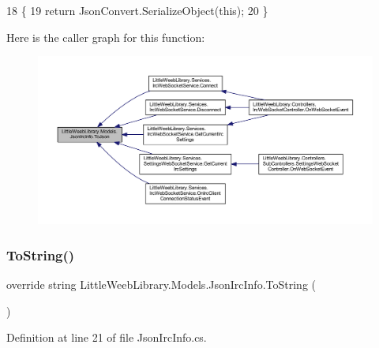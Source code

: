 \begin{DoxyCode}
18         \{
19             \textcolor{keywordflow}{return} JsonConvert.SerializeObject(\textcolor{keyword}{this});
20         \}
\end{DoxyCode}
Here is the caller graph for this function\+:\nopagebreak
\begin{figure}[H]
\begin{center}
\leavevmode
\includegraphics[width=350pt]{class_little_weeb_library_1_1_models_1_1_json_irc_info_af7d4dd885c7289ca28b0147d4feb2b84_icgraph}
\end{center}
\end{figure}
\mbox{\label{class_little_weeb_library_1_1_models_1_1_json_irc_info_a7a9635e9efc6d62801ec57bdb90c1cee}} 
\subsubsection{\texorpdfstring{To\+String()}{ToString()}}
{\footnotesize\ttfamily override string Little\+Weeb\+Library.\+Models.\+Json\+Irc\+Info.\+To\+String (\begin{DoxyParamCaption}{ }\end{DoxyParamCaption})}



Definition at line 21 of file Json\+Irc\+Info.\+cs.


